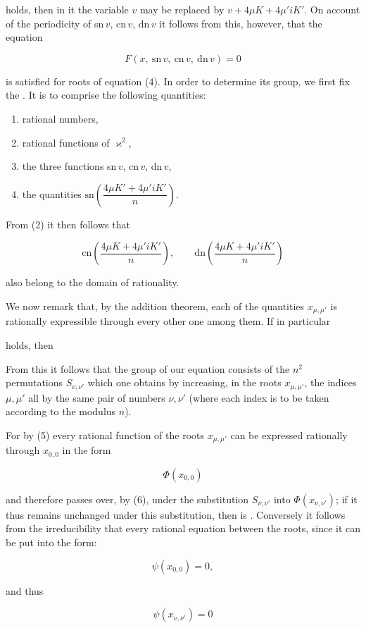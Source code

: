 
holds, then in it the variable $v$ may be replaced by $v + 4\mu K + 4\mu' iK'$.
On account of the periodicity of sn\,$v$, cn\,$v$, dn\,$v$ it follows from this,
however, that the equation

\[
F(x,\ \mathrm{sn}\,v,\ \mathrm{cn}\,v,\ \mathrm{dn}\,v) = 0
\]

is satisfied for  roots of equation (4). In order to determine its 
group, we first fix the . It is to comprise the
following quantities:

\begin{enumerate}
\item[1.] rational numbers,
\item[2.] rational functions of $\varkappa^2$,
\item[3.] the three functions sn\,$v$, cn\,$v$, dn\,$v$,
\item[4.] the quantities $\mathrm{sn}\left(\dfrac{4\mu K' + 4\mu' iK'}{n}\right)$. %
\end{enumerate}

From (2) it then follows that

\[
\mathrm{cn}\left(\frac{4\mu K + 4\mu' iK'}{n}\right), \qquad \mathrm{dn}\left(\frac{4\mu K + 4\mu' iK'}{n}\right)
\]

also belong to the domain of rationality.

We now remark that, by the addition theorem, each of the quantities
$x_{\mu,\mu'}$ is rationally expressible through every other one among
them. If in particular


holds, then


From this it follows that the  group of our equation consists of the
$n^2$ permutations $S_{\nu,\nu'}$ which one obtains by increasing, in the
roots $x_{\mu,\mu'}$, the indices $\mu, \mu'$ all by the same pair of
numbers $\nu, \nu'$ (where each index is to be taken according to the
modulus $n$).

For by (5) every rational function of the roots
$x_{\mu,\mu'}$ can be expressed rationally through $x_{0,0}$ in the form

\[
\Phi(x_{0,0})
\]

and therefore passes over, by (6), under the substitution
$S_{\nu,\nu'}$ into $\Phi(x_{\nu,\nu'})$; if it thus remains unchanged under this
substitution, then  is . Conversely it follows from the
irreducibility that every rational equation between the roots,
since it can be put into the form:

\[
\psi(x_{0,0}) = 0,
\]

and thus

\[
\psi(x_{\nu,\nu'}) = 0
\]
